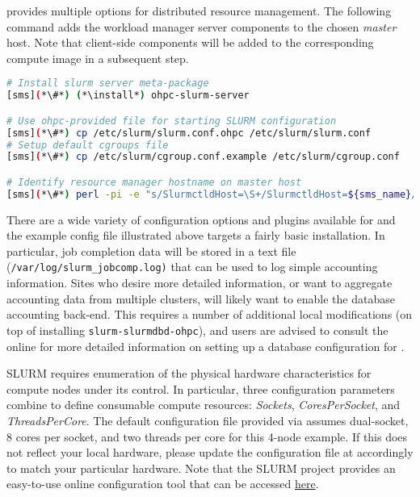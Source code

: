 \OHPC{} provides multiple options for distributed resource management. 
The following command adds the \SLURM{} workload manager server components to the
chosen {\em master} host. Note that client-side components will be added to
the corresponding compute image in a subsequent step.

\begin{lstlisting}[language=bash,keywords={}]
# Install slurm server meta-package
[sms](*\#*) (*\install*) ohpc-slurm-server

# Use ohpc-provided file for starting SLURM configuration
[sms](*\#*) cp /etc/slurm/slurm.conf.ohpc /etc/slurm/slurm.conf
# Setup default cgroups file
[sms](*\#*) cp /etc/slurm/cgroup.conf.example /etc/slurm/cgroup.conf

# Identify resource manager hostname on master host
[sms](*\#*) perl -pi -e "s/SlurmctldHost=\S+/SlurmctldHost=${sms_name}/" /etc/slurm/slurm.conf
\end{lstlisting}

There are a wide variety of configuration options and plugins available
for \SLURM{} and the example config file illustrated above targets a fairly
basic installation. In particular, job completion data will be stored in a text
file (\texttt{/var/log/slurm\_jobcomp.log)} that can be used to log simple
accounting information. Sites who desire more detailed information, or want to
aggregate accounting data from multiple clusters, will likely want to enable the
database accounting back-end.  This requires a number of additional local modifications
(on top of installing \texttt{slurm-slurmdbd-ohpc}), and users are advised to
consult the online \href{https://slurm.schedmd.com/accounting.html}{\color{blue}{documentation}}
for more detailed information on setting up a database configuration for \SLURM{}.

\begin{center}
\begin{tcolorbox}[]
  \small SLURM requires enumeration of the physical hardware characteristics
  for compute nodes under its control. In particular, three configuration
  parameters combine to define consumable compute resources: {\em Sockets},
  {\em CoresPerSocket}, and {\em ThreadsPerCore}. The default configuration
  file provided via \OHPC{} assumes dual-socket, 8 cores per socket, and two
  threads per core for this 4-node example. If this does not reflect your local
  hardware, please update the configuration file at
   accordingly to match your particular hardware.
  Note that the SLURM project provides an easy-to-use online configuration tool that
  can be accessed
 \href{https://slurm.schedmd.com/configurator.html}{\color{blue} here}. 
\end{tcolorbox}
\end{center}

